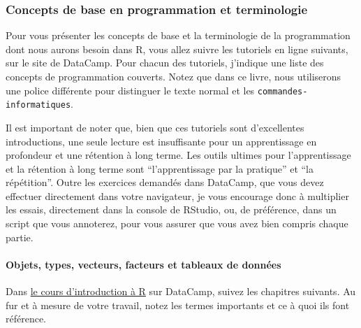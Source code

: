 \documentclass[a4paperpaper,]{article}
\let\oldparagraph\paragraph
\renewcommand{\paragraph}[1]{\oldparagraph{#1}\mbox{}}
\theoremstyle{definition}
\theoremstyle{definition}
\theoremstyle{definition}
\theoremstyle{remark}
\begin{document}
\hypertarget{concepts-de-base-en-programmation-et-terminologie}{%
\subsubsection{Concepts de base en programmation et
terminologie}\label{concepts-de-base-en-programmation-et-terminologie}}

Pour vous présenter les concepts de base et la terminologie de la
programmation dont nous aurons besoin dans R, vous allez suivre les
tutoriels en ligne suivants, sur le site de DataCamp. Pour chacun des
tutoriels, j'indique une liste des concepts de programmation couverts.
Notez que dans ce livre, nous utiliserons une police différente pour
distinguer le texte normal et les \texttt{commandes-informatiques}.

Il est important de noter que, bien que ces tutoriels sont d'excellentes
introductions, une seule lecture est insuffisante pour un apprentissage
en profondeur et une rétention à long terme. Les outils ultimes pour
l'apprentissage et la rétention à long terme sont ``l'apprentissage par
la pratique'' et ``la répétition''. Outre les exercices demandés dans
DataCamp, que vous devez effectuer directement dans votre navigateur, je
vous encourage donc à multiplier les essais, directement dans la console
de RStudio, ou, de préférence, dans un script que vous annoterez, pour
vous assurer que vous avez bien compris chaque partie.

\hypertarget{objects}{%
\paragraph{Objets, types, vecteurs, facteurs et tableaux de
données}\label{objects}}

Dans
\href{https://www.datacamp.com/community/open-courses/introduction-a-r}{le
cours d'introduction à R} sur DataCamp, suivez les chapitres suivants.
Au fur et à mesure de votre travail, notez les termes importants et ce à
quoi ils font référence.
\end{document}
